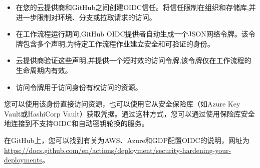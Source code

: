 \begin{itemize}
\item 
在您的云提供商和GitHub之间创建OIDC信任。将信任限制在组织和存储库,并进一步限制对环境、分支或拉取请求的访问。

\item 
在工作流程运行期间,GitHub OIDC提供者自动生成一个JSON网络令牌。该令牌包含多个声明,为特定工作流程作业建立安全和可验证的身份。

\item 
云提供商验证这些声明,并提供一个短时效的访问令牌,该令牌仅在工作流程的生命周期内有效。

\item 
访问令牌用于访问身份有权访问的资源。
\end{itemize}

您可以使用该身份直接访问资源，也可以使用它从安全保险库（如Azure Key Vault或HashiCorp Vault）获取凭据。通过这种方式，您可以通过使用保险库安全地连接到不支持OIDC和自动密钥轮换的服务。

在GitHub上，您可以找到有关为AWS、Azure和GDP配置OIDC的说明，网址为\url{https://docs.github.com/en/actions/deployment/security-hardening-your-deployments}。
